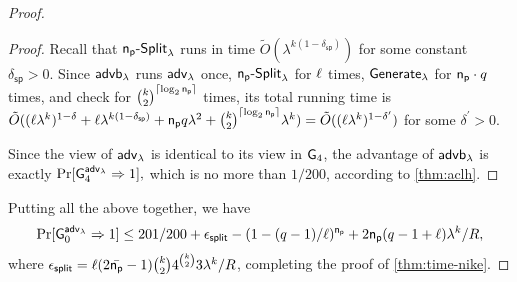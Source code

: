 \begin{proof}
\begin{proof}
	Recall that $\mathsf{n_p}\text{-}{\mathsf{Split}}_\lambda$ runs in time $\tilde{O}(\lambda^{k(1-\delta_{\mathsf{sp}})})$ for some constant $\delta_{\mathsf{sp}}>0$. Since $\mathsf{advb}_{\lambda}$ runs ${\mathsf{adv}}_\lambda$ once, $\mathsf{n_p}\text{-}{\mathsf{Split}}_\lambda$ for $\ell$ times, ${\mathsf{Generate}}_\lambda$ for $\mathsf{n_p}\cdot q$ times, and check for $\binom{k}{2}^{\lceil\log_2\mathsf{n_p}\rceil}$ times, its total running time is $\tilde{O}((\ell\lambda^k)^{1-\delta}+\ell\lambda^{k(1-\delta_{\mathsf{sp}})} + \mathsf{n_p}q \lambda^2+\binom{k}{2}^{\lceil\log_2\mathsf{n_p}\rceil}\lambda^k)=\tilde{O}((\ell\lambda^k)^{1-\delta^\prime})$ for some $\delta^\prime >0$.

	Since the view of ${\mathsf{adv}}_\lambda$ is identical to its view in $\mathsf{G}_4$, the advantage of $\mathsf{advb}_{\lambda}$ is exactly 
	$\Pr[\mathsf{G}_4^{{\mathsf{adv}}_\lambda}\Rightarrow 1],$
	 which is  no more than $1/200$, according to \cref{thm:aclh}.
\end{proof}

Putting all the above together, we have
\[\begin{split}
	\Pr[\mathsf{G}_0^{{\mathsf{adv}}_\lambda}\Rightarrow 1]
	\leq 201/200 + \epsilon_{\mathsf{split}} -(1-(q-1)/\ell)^{\mathsf{n_p}}
	\allowbreak+2\mathsf{n_p}(q-1+\ell)\lambda^{k}/{R},
\end{split}\]
	where $\epsilon_{\mathsf{split}} = \ell(2\bar{\mathsf{n_p}}-1)\binom{k}{2}4^{\binom{k}{2}}3\lambda^k/{R}$, completing the proof of \cref{thm:time-nike}.
	\end{proof}
